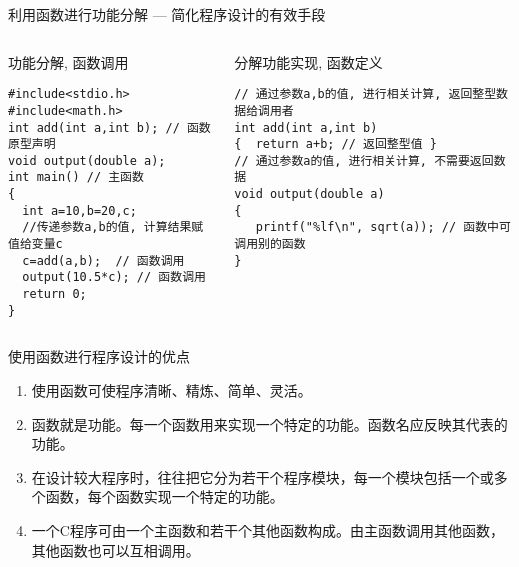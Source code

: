 \begin{frame}{利用函数进行功能分解 --- 简化程序设计的有效手段}
\vspace{-0.3cm}
\begin{columns}[T]
\begin{beamerboxesrounded}{功能分解, 函数调用}
\begin{lstlisting}
#include<stdio.h>
#include<math.h>
int add(int a,int b); // 函数原型声明
void output(double a);
int main() // 主函数
{
  int a=10,b=20,c;
  //传递参数a,b的值, 计算结果赋值给变量c 
  c=add(a,b);  // 函数调用
  output(10.5*c); // 函数调用
  return 0; 
}
\end{lstlisting}
\end{beamerboxesrounded}
\begin{beamerboxesrounded}{分解功能实现, 函数定义}
\begin{lstlisting}
// 通过参数a,b的值, 进行相关计算, 返回整型数据给调用者
int add(int a,int b)
{  return a+b; // 返回整型值 }
// 通过参数a的值, 进行相关计算, 不需要返回数据
void output(double a)
{  
   printf("%lf\n", sqrt(a)); // 函数中可调用别的函数
}
\end{lstlisting}
\end{beamerboxesrounded}
\end{columns}
\end{frame}

\begin{frame}{使用函数进行程序设计的优点}
\begin{enumerate}
	\setlength{\itemsep}{.5cm}
	\item 使用函数可使程序清晰、精炼、简单、灵活。
	\item 函数就是功能。每一个函数用来实现一个特定的功能。函数名应反映其代表的功能。
	\item 在设计较大程序时，往往把它分为若干个程序模块，每一个模块包括一个或多个函数，每个函数实现一个特定的功能。
	\item 一个C程序可由一个主函数和若干个其他函数构成。由主函数调用其他函数，其他函数也可以互相调用。	
\end{enumerate}
\end{frame}


